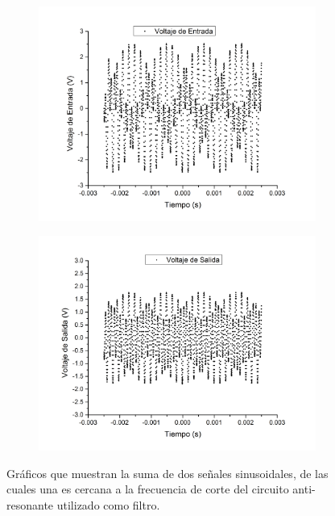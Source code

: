 \documentclass[11pt,a4paper]{article}
\begin{document}
\begin{figure}[H]
	\begin{subfigure}{0.5\textwidth}
		\includegraphics[scale=0.3]{5Khz}
		\label{subfig:5k_NFilt}
	\end{subfigure}
	\begin{subfigure}{0.5\textwidth}
		\includegraphics[scale=0.3]{5Khz_Filtrado}
		\label{subfig:5k_Filt}
	\end{subfigure}
	\caption{Gráficos que muestran la suma de dos señales sinusoidales, de las cuales una es cercana a la frecuencia de corte del circuito anti-resonante utilizado 
como filtro.}
	\label{fig:5k}
\end{figure}
\end{document}
